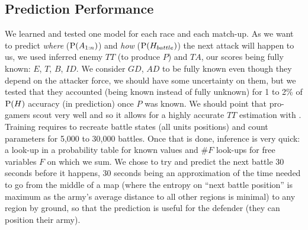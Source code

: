 \subsection{Prediction Performance}
We learned and tested one model for each race and each match-up. As we want to predict \textit{where} ($\mathrm{P}(A_{1:n})$) and \textit{how} ($\mathrm{P}(H_{battle})$) the next attack will happen to us, we used inferred enemy $TT$ (to produce $P$) and $TA$, our scores being fully known: $E$, $T$, $B$, $ID$. We consider $GD$, $AD$ to be fully known even though they depend on the attacker force, we should have some uncertainty on them, but we tested that they accounted (being known instead of fully unknown) for 1 to 2\% of $\mathrm{P}(H)$ accuracy (in prediction) once $P$ was known. We should point that pro-gamers scout very well and so it allows for a highly accurate $TT$ estimation with \cite{SYNNAEVE:StratPred}. Training requires to recreate battle states (all units positions) and count parameters for 5,000 to 30,000 battles. Once that is done, inference is very quick: a look-up in a probability table for known values and $\#F$ look-ups for free variables $F$ on which we sum. We chose to try and predict the next battle 30 seconds before it happens, 30 seconds being an approximation of the time needed to go from the middle of a map (where the entropy on ``next battle position'' is maximum as the army's average distance to all other regions is minimal) to any region by ground, so that the prediction is useful for the defender (they can position their army).

